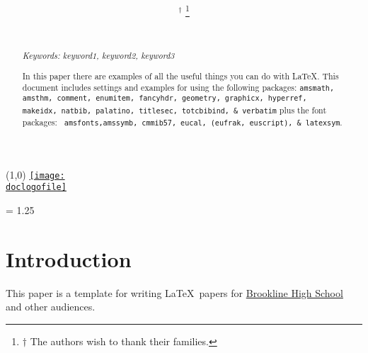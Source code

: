 \documentclass[11pt]{article}%
\title{{\bf \doctitle}}%
\author{\docauthortwo \\ \docschooltwo \\ \small{\lemail{\docemailtwo}}
 \and \docauthor$^\dagger$%
  \thanks{$\dagger$ The authors wish to thank their families.} \\ \docschool \\ \small{\lemail{\docemail}}}%
\date{} %
\def\doclogofile{../../images/CSTA-GreaterBoston-logo-500x100.png}
\def\doclogo{\href{https://greaterboston.csteachers.org/}{\texttt{[image: \\doclogofile]}}}
\begin{document}
\setlength{\TPHorizModule}{.25in}
\setlength{\TPVertModule}{\TPHorizModule}
\textblockorigin{6.125in}{0.25in} %
\setlength{\parindent}{0pt}
\begin{textblock}{32}(1,0)
 \doclogo
\end{textblock}

\maketitle

\begin{multicols*}{2}
\begin{abstract}


{\em Keywords: keyword1, keyword2, keyword3 %

In this paper there are examples of all the useful things you can do
with \LaTeX. This document includes settings and examples for using
the following packages: {\tt amsmath, amsthm, comment, enumitem,
fancyhdr, geometry, graphicx, hyperref, makeidx, natbib, palatino,
titlesec, totcbibind, \& verbatim} plus the font packages: {\tt
amsfonts,amssymb, cmmib57, eucal, (eufrak, euscript), \& latexsym}.

}

\end{abstract}


\baselineskip = 1.25\baselineskip %

\section{Introduction}
\label{Introduction}

This paper is a template for writing \LaTeX\ papers for
\href{http://j.mp/psb_david_petty}{Brookline High School} and other
audiences.

\begin{comment} %

In this paper there are examples of all the useful things you can do
with \LaTeX. This document includes settings and examples for using
the following packages: {\tt amsmath, amsthm, comment, enumitem,
fancyhdr, geometry, graphicx, hyperref, makeidx, natbib, palatino,
titlesec, totcbibind, \& verbatim} plus the font packages: {\tt
amsfonts,amssymb, cmmib57, eucal, (eufrak, euscript), \& latexsym}


\end{comment}
\end{multicols*}
\end{document}
